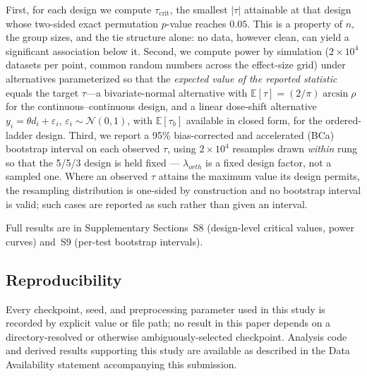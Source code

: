 First, for each design we compute $\tau_{\mathrm{crit}}$, the smallest $|\tau|$ attainable at that design whose two-sided exact permutation $p$-value reaches $0.05$. This is a property of $n$, the group sizes, and the tie structure alone: no data, however clean, can yield a significant association below it. Second, we compute power by simulation ($2\times10^{4}$ datasets per point, common random numbers across the effect-size grid) under alternatives parameterized so that the \emph{expected value of the reported statistic} equals the target $\tau$---a bivariate-normal alternative with $\mathbb{E}[\tau]=(2/\pi)\arcsin\rho$ for the continuous--continuous design, and a linear dose-shift alternative $y_i=\theta d_i+\varepsilon_i$, $\varepsilon_i\sim\mathcal{N}(0,1)$, with $\mathbb{E}[\tau_b]$ available in closed form, for the ordered-ladder design. Third, we report a 95\% bias-corrected and accelerated (BCa) bootstrap interval on each observed $\tau$, using $2\times10^{4}$ resamples drawn \emph{within} rung so that the 5/5/3 design is held fixed --- $\lambda_{orth}$ is a fixed design factor, not a sampled one. Where an observed $\tau$ attains the maximum value its design permits, the resampling distribution is one-sided by construction and no bootstrap interval is valid; such cases are reported as such rather than given an interval.

Full results are in Supplementary Sections~S8 (design-level critical values, power curves) and~S9 (per-test bootstrap intervals).

\subsection{Reproducibility}
\label{sec:reproducibility}

Every checkpoint, seed, and preprocessing parameter used in this study is recorded by explicit value or file path; no result in this paper depends on a directory-resolved or otherwise ambiguously-selected checkpoint. Analysis code and derived results supporting this study are available as described in the Data Availability statement accompanying this submission.

